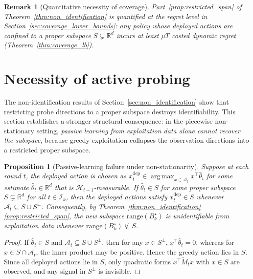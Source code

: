 \documentclass[12pt]{article}
\newcommand{\R}{\mathbb{R}}
\newcommand{\cA}{\mathcal{A}}
\newcommand{\cH}{\mathcal{H}}
\newcommand{\cI}{\mathcal{I}}
\newcommand{\range}{\mathrm{range}}
\DeclareMathOperator*{\argmax}{arg\,max}
\newtheorem{proposition}{Proposition}
\newtheorem{remark}{Remark}
\theoremstyle{plain}
\theoremstyle{definition}
\begin{document}
\begin{remark}[Quantitative necessity of coverage]
\label{rem:coverage_quantitative}
Part~\ref{prop:restricted_span} of Theorem~\ref{thm:non_identification} is quantified at the regret level in Section~\ref{sec:coverage_lower_bounds}: any policy whose deployed actions are confined to a proper subspace $S \subsetneq \R^d$ incurs at least $\mu T$ costed dynamic regret (Theorem~\ref{thm:coverage_lb}).
\end{remark}


\section{Necessity of active probing}
\label{sec:probing_justification}

The non-identification results of Section~\ref{sec:non_identification} show that restricting probe directions to a proper subspace destroys identifiability. This section establishes a stronger structural consequence: in the piecewise non-stationary setting, \emph{passive learning from exploitation data alone cannot recover the subspace}, because greedy exploitation collapses the observation directions into a restricted proper subspace.

\begin{proposition}[Passive-learning failure under non-stationarity]
\label{prop:passive_failure}
Suppose at each round $t$, the deployed action is chosen as $x_t^{\mathrm{dep}} \in \argmax_{x \in \cA_t} x^\top \widehat{\theta}_t$ for some estimate $\widehat{\theta}_t \in \R^d$ that is $\cH_{t-1}$-measurable. If $\widehat{\theta}_t \in S$ for some proper subspace $S \subsetneq \R^d$ for all $t \in \cI_k$, then the deployed actions satisfy $x_t^{\mathrm{dep}} \in S$ whenever $\cA_t \subseteq S \cup S^\perp$. Consequently, by Theorem~\ref{thm:non_identification}\ref{prop:restricted_span}, the new subspace $\range(B_k^\star)$ is unidentifiable from exploitation data whenever $\range(B_k^\star) \not\subseteq S$.
\end{proposition}

\begin{proof}
If $\widehat{\theta}_t \in S$ and $\cA_t \subseteq S \cup S^\perp$, then for any $x \in S^\perp$, $x^\top \widehat{\theta}_t = 0$, whereas for $x \in S \cap \cA_t$, the inner product may be positive. Hence the greedy action lies in $S$. Since all deployed actions lie in $S$, only quadratic forms $x^\top \widetilde{M}_t x$ with $x \in S$ are observed, and any signal in $S^\perp$ is invisible.
\end{proof}
\end{document}
